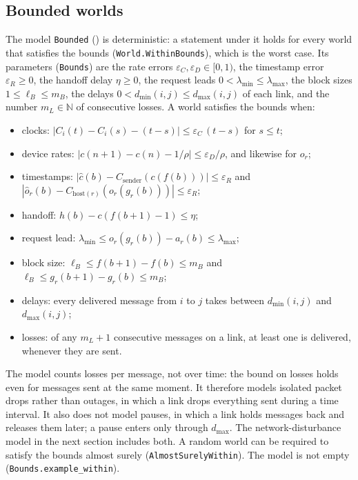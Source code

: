 \documentclass[11pt,a4paper]{article}
\newcommand{\lean}[1]{\texttt{#1}}
\newcommand{\N}{\mathbb{N}}
\theoremstyle{definition}
\begin{document}
\subsection{Bounded worlds}

The model \lean{Bounded} () is
deterministic: a statement under it holds for every world that satisfies the
bounds (\lean{World.WithinBounds}), which is the worst case.
Its parameters (\lean{Bounds}) are the rate errors
$\varepsilon_C, \varepsilon_D \in [0, 1)$, the timestamp error
$\varepsilon_R \ge 0$, the handoff delay $\eta \ge 0$, the request leads
$0 < \lambda_{\min} \le \lambda_{\max}$, the block sizes
$1 \le \ell_B \le m_B$, the
delays $0 < d_{\min}(i,j) \le d_{\max}(i,j)$ of each link, and the number
$m_L \in \N$ of consecutive losses. A world satisfies the bounds when:
\begin{itemize}
\item clocks: $|C_i(t) - C_i(s) - (t - s)| \le \varepsilon_C\,(t - s)$ for
  $s \le t$;
\item device rates: $|c(n+1) - c(n) - 1/\rho| \le \varepsilon_D/\rho$, and
  likewise for $o_r$;
\item timestamps: $|\hat c(b) - C_{\mathrm{sender}}(c(f(b)))| \le
  \varepsilon_R$ and $|\hat o_r(b) - C_{\mathrm{host}(r)}(o_r(g_r(b)))| \le
  \varepsilon_R$;
\item handoff: $h(b) - c(f(b+1) - 1) \le \eta$;
\item request lead: $\lambda_{\min} \le o_r(g_r(b)) - a_r(b) \le
  \lambda_{\max}$;
\item block size: $\ell_B \le f(b+1) - f(b) \le m_B$ and
  $\ell_B \le g_r(b+1) - g_r(b) \le m_B$;
\item delays: every delivered message from $i$ to $j$ takes between
  $d_{\min}(i,j)$ and $d_{\max}(i,j)$;
\item losses: of any $m_L + 1$ consecutive messages on a link, at least one
  is delivered, whenever they are sent.
\end{itemize}
The model counts losses per message, not over time: the bound on losses
holds even for messages sent at the same moment. It therefore models
isolated packet drops rather than outages, in which a link drops everything
sent during a time interval. It also does not model pauses, in which a link
holds messages back and releases them later; a pause enters only through
$d_{\max}$. The network-disturbance model in the next section includes both.
A random world can be required to satisfy the bounds almost surely
(\lean{AlmostSurelyWithin}). The model is not empty
(\lean{Bounds.example\_within}).
\end{document}
